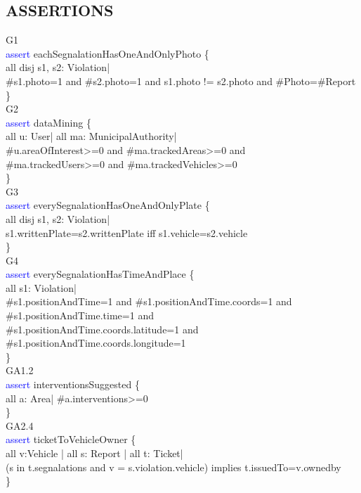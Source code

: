 \subsection{ASSERTIONS}
G1\\
\textcolor{blue}{assert}
\textcolor{mycolor}{eachSegnalationHasOneAndOnlyPhoto} \{\\
all disj s1, s2: Violation|\\ 
\#s1.photo=1 and \#s2.photo=1 and s1.photo != s2.photo
and \#Photo=\#Report\\
\}\\
G2\\
\textcolor{blue}{assert}
\textcolor{mycolor}{dataMining} \{\\
all u: User| all ma: MunicipalAuthority|\\
\#u.areaOfInterest>=0 and \#ma.trackedAreas>=0 and\\ \#ma.trackedUsers>=0 and \#ma.trackedVehicles>=0\\
\}\\
G3\\
\textcolor{blue}{assert}
\textcolor{mycolor}{everySegnalationHasOneAndOnlyPlate} \{\\
    all disj s1, s2: Violation|\\
s1.writtenPlate=s2.writtenPlate iff s1.vehicle=s2.vehicle\\
\}\\
G4\\
\textcolor{blue}{assert}
\textcolor{mycolor}{everySegnalationHasTimeAndPlace} \{\\
all s1: Violation|\\
\#s1.positionAndTime=1 and \#s1.positionAndTime.coords=1 and \#s1.positionAndTime.time=1 and\\ 
\#s1.positionAndTime.coords.latitude=1 and \#s1.positionAndTime.coords.longitude=1\\
\}\\
GA1.2\\
\textcolor{blue}{assert}
\textcolor{mycolor}{interventionsSuggested} \{\\
all a: Area| \#a.interventions>=0\\
\}\\
GA2.4\\
\textcolor{blue}{assert}
\textcolor{mycolor}{ticketToVehicleOwner} \{\\
all v:Vehicle | all s: Report | all t: Ticket|\\
(s in t.segnalations and v = s.violation.vehicle) implies t.issuedTo=v.ownedby\\
\}\\
\\
